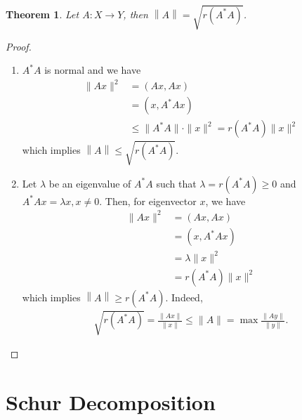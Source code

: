 \documentclass[11pt]{book}
\newtheorem{theorem}{Theorem}[chapter]
\theoremstyle{definition}
\numberwithin{equation}{chapter}
\begin{document}
\medskip

\begin{theorem}
Let $A:X\to Y$, then $\left\|A\right\| = \sqrt{r(A^*A)}$.
\end{theorem}
\begin{proof}
~\begin{enumerate}[label=(\alph*)]
    \item $A^*A$ is normal and we have
    \begin{align*}
        \|Ax\|^2 & = (Ax, Ax) \\
        & = (x, A^*Ax) \\
        & \leq \|A^*A\|\cdot \|x\|^2 = r(A^*A) \|x\|^2
    \end{align*}
    which implies $\left\|A\right\| \leq \sqrt{r(A^*A)}$.
    \item Let $\lambda$ be an eigenvalue of $A^*A$ such that $\lambda = r(A^*A) \geq 0$ and $A^*Ax = \lambda x, x\neq 0$. Then, for eigenvector $x$, we have
    \begin{align*}
        \|Ax\|^2 & = (Ax,Ax) \\
        & = (x,A^*Ax) \\
        & = \lambda \|x\|^2 \\
        & = r(A^*A) \|x\|^2 
    \end{align*}
    which implies $\left\|A\right\| \geq r(A^*A)$. Indeed, 
    \begin{align*}
        \sqrt{r(A^*A)} = \frac{\|Ax\|}{\|x\|} \leq \|A\| = \max \frac{\|Ay\|}{\|y\|}.
    \end{align*}
\end{enumerate}
\end{proof}

\medskip

\section{Schur Decomposition}
\end{document}
